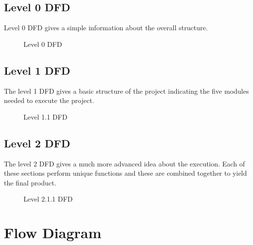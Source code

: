 \documentclass[12pt,a4paper,oneside]{report}
\begin{document}
{\newpage
\subsection{Level 0 DFD}
Level 0 DFD gives a simple information about the overall structure. 
\begin{figure}[h!]
\begin{center}

\hspace{1 in}
\caption{Level 0 DFD}
\end{center}
\end{figure}

\subsection{Level 1 DFD}
The level 1 DFD gives a basic structure of the project indicating the five modules needed to execute the project.
\newpage
\begin{figure}[h]
\begin{center}
\hspace{1 in}
\caption{Level 1.1 DFD}
\end{center}
\vspace{-1.5 in}
\end{figure}

\vspace{100pt}
\subsection{Level 2 DFD}
The level 2 DFD gives a much more advanced idea about the execution. Each of these sections perform unique functions and these are combined together to yield the final product.
\begin{figure}[h]
\begin{center}
\vspace{0.5 in}
\hspace{.0 in}
\caption{Level 2.1.1 DFD}
\end{center}

\end{figure}
\pagebreak

\section{Flow Diagram}
\begin{figure}[h]
\begin{center}


\end{center}
\end{figure}}
\end{document}
